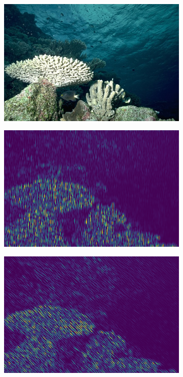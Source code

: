 \begin{figure}[h!]
	\begin{subfigure}[t]{0.32\textwidth}
		\centering
		\includegraphics[width=\textwidth,keepaspectratio]{images/bsd/101027.jpg}
		\captionsetup{format=plain}
		\subcaption{}
		\label{fig:bsd_101027}
	\end{subfigure}
	\hfill
	\begin{subfigure}[t]{0.32\textwidth}
		\centering
		\includegraphics[width=\textwidth,keepaspectratio]{images/gen/convolution/101027.jpg_0.png}
		\subcaption{}
	\end{subfigure}
	\hfill
	\begin{subfigure}[t]{0.32\textwidth}
		\centering
		\includegraphics[width=\textwidth,keepaspectratio]{images/gen/convolution/101027.jpg_1.png}

\end{subfigure}
\end{figure}
